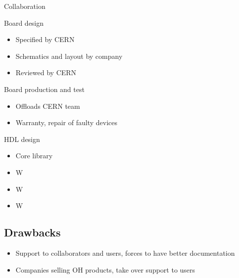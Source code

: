 \documentclass[compress,red]{beamer}
\begin{document}
\begin{frame}{Collaboration}

  \begin{block}{Board design}
    \begin{itemize}
    \item Specified by CERN
    \item Schematics and layout by company
    \item Reviewed by CERN
    \end{itemize}
  \end{block}

  \begin{block}{Board production and test}
    \begin{itemize}
    \item Offloads CERN team
    \item Warranty, repair of faulty devices
    \end{itemize}
  \end{block}

  \begin{block}{HDL design}
    \begin{itemize}
    \item Core library
    \end{itemize}
  \end{block}

\end{frame}

\begin{frame}{}

  \begin{block}{}
    \begin{itemize}
    \item W
    \item W
    \item W
    \end{itemize}
  \end{block}

\end{frame}


\subsection{Drawbacks}

\begin{frame}{}

  \begin{block}{}
    \begin{itemize}
    \item Support to collaborators and users, forces to have better documentation
    \item Companies selling OH products, take over support to users
    \end{itemize}
  \end{block}

\end{frame}
\end{document}
